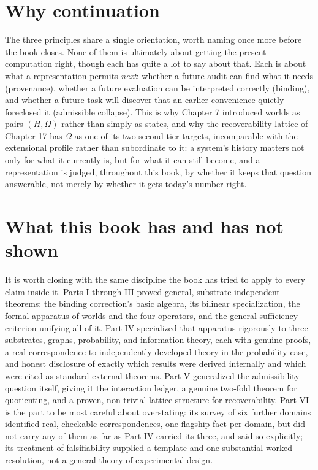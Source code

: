 \documentclass[11pt]{book}
\begin{document}
\section{Why continuation}

The three principles share a single orientation, worth naming once more before the book closes. None of them is ultimately about getting the present computation right, though each has quite a lot to say about that. Each is about what a representation permits \emph{next}: whether a future audit can find what it needs (provenance), whether a future evaluation can be interpreted correctly (binding), and whether a future task will discover that an earlier convenience quietly foreclosed it (admissible collapse). This is why Chapter 7 introduced worlds as pairs $(H,\Omega)$ rather than simply as states, and why the recoverability lattice of Chapter 17 has $\Omega$ as one of its two second-tier targets, incomparable with the extensional profile rather than subordinate to it: a system's history matters not only for what it currently is, but for what it can still become, and a representation is judged, throughout this book, by whether it keeps that question answerable, not merely by whether it gets today's number right.

\section{What this book has and has not shown}

It is worth closing with the same discipline the book has tried to apply to every claim inside it. Parts I through III proved general, substrate-independent theorems: the binding correction's basic algebra, its bilinear specialization, the formal apparatus of worlds and the four operators, and the general sufficiency criterion unifying all of it. Part IV specialized that apparatus rigorously to three substrates, graphs, probability, and information theory, each with genuine proofs, a real correspondence to independently developed theory in the probability case, and honest disclosure of exactly which results were derived internally and which were cited as standard external theorems. Part V generalized the admissibility question itself, giving it the interaction ledger, a genuine two-fold theorem for quotienting, and a proven, non-trivial lattice structure for recoverability. Part VI is the part to be most careful about overstating: its survey of six further domains identified real, checkable correspondences, one flagship fact per domain, but did not carry any of them as far as Part IV carried its three, and said so explicitly; its treatment of falsifiability supplied a template and one substantial worked resolution, not a general theory of experimental design.
\end{document}
